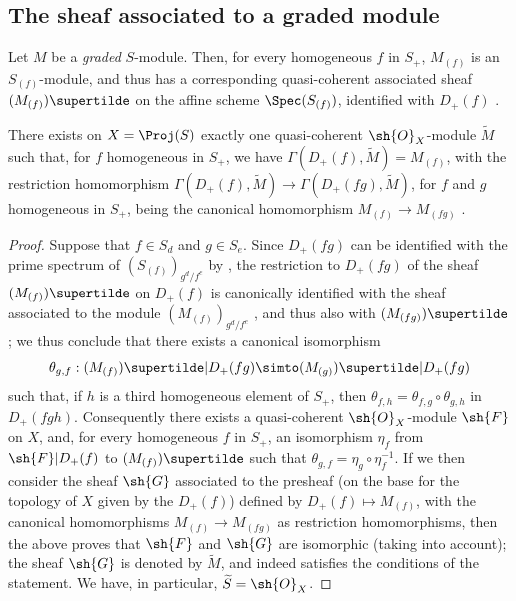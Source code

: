 \subsection{The sheaf associated to a graded module}
\label{subsection:II.2.5}

\begin{env}[2.5.1]
\label{II.2.5.1}
Let $M$ be a \emph{graded} $S$-module.
Then, for every homogeneous $f$ in $S_+$, $M_{(f)}$ is an $S_{(f)}$-module, and thus has a corresponding quasi-coherent associated sheaf $(M_{(f)})\supertilde$ on the affine scheme $\Spec(S_{(f)})$, identified with $D_+(f)$ .
\end{env}

\begin{proposition}[2.5.2]
\label{II.2.5.2}
There exists on $X=\Proj(S)$ exactly one quasi-coherent $\sh{O}_X$-module $\widetilde{M}$ such that, for $f$ homogeneous in $S_+$, we have $\Gamma(D_+(f),\widetilde{M})=M_{(f)}$, with the restriction homomorphism $\Gamma(D_+(f),\widetilde{M})\to\Gamma(D_+(fg),\widetilde{M})$, for $f$ and $g$ homogeneous in $S_+$, being the canonical homomorphism $M_{(f)}\to M_{(fg)}$ .
\end{proposition}

\begin{proof}
Suppose that $f\in S_d$ and $g\in S_e$.
Since $D_+(fg)$ can be identified with the prime spectrum of $(S_{(f)})_{g^d/f^e}$ by , the restriction to $D_+(fg)$ of the sheaf $(M_{(f)})\supertilde$ on $D_+(f)$ is canonically identified with the sheaf associated to the module $(M_{(f)})_{g^d/f^e}$ , and thus also with $(M_{(fg)})\supertilde$ ;
we thus conclude that there exists a canonical isomorphism
\[
  \theta_{g,f}: (M_{(f)})\supertilde|D_+(fg) \simto (M_{(g)})\supertilde|D_+(fg)
\]
such that, if $h$ is a third homogeneous element of $S_+$, then $\theta_{f,h}=\theta_{f,g}\circ\theta_{g,h}$ in $D_+(fgh)$.
Consequently  there exists a quasi-coherent $\sh{O}_X$-module $\sh{F}$ on $X$, and, for every homogeneous $f$ in $S_+$, an isomorphism $\eta_f$ from $\sh{F}|D_+(f)$ to $(M_{(f)})\supertilde$ such that $\theta_{g,f}=\eta_g\circ\eta_f^{-1}$.
If we then consider the sheaf $\sh{G}$ associated to the presheaf (on the base for the topology of $X$ given by the $D_+(f)$) defined by $D_+(f)\mapsto M_{(f)}$, with the canonical homomorphisms $M_{(f)}\to M_{(fg)}$ as restriction homomorphisms, then the above proves that $\sh{F}$ and $\sh{G}$ are isomorphic (taking  into account);
the sheaf $\sh{G}$ is denoted by $\widetilde{M}$, and indeed satisfies the conditions of the statement.
We have, in particular, $\widetilde{S}=\sh{O}_X$.
\end{proof}

